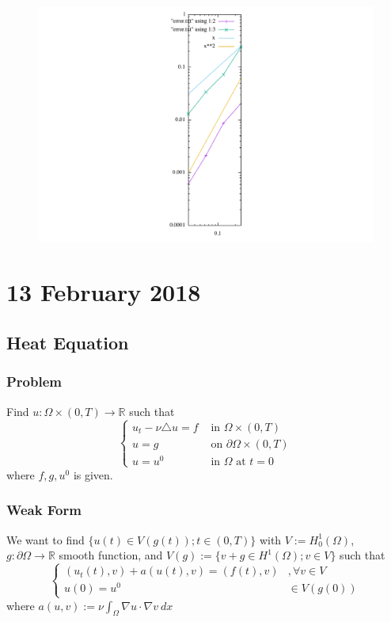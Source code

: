 \documentclass[a4paper,10pt]{article}
\begin{document}
\begin{figure}[h!]
	\centering
	\includegraphics[width=0.7\linewidth]{picture/Figure}
	\caption{}
	\label{fig:figure}
\end{figure}

\section{13 February 2018}
\subsection{Heat Equation}
\subsubsection{Problem}
Find $ u : \Omega \times (0,T) \rightarrow \mathbb{R} $ such that
\[ \begin{cases}
u_{t} - \nu \triangle u = f &\text{ in } \Omega \times (0,T) \\
u = g &\text{ on } \partial\Omega \times (0,T) \\
u = u^{0} &\text{ in } \Omega \text{ at } t=0
\end{cases} \]
where $ f,g,u^{0} $ is given.

\subsubsection{Weak Form}
We want to find $ \{ u(t) \in V(g(t)) ; t \in (0,T)\} $ with $ V := H_{0}^{1}(\Omega) $, $ g : \partial\Omega \rightarrow \mathbb{R} $ smooth function, and $ V(g) := \{ v+g \in H^{1}(\Omega) ; v \in V \} $ such that
\[ \begin{cases}
(u_{t}(t),v) + a(u(t),v) = (f(t),v) &, \forall v \in V \\
u(0) = u^{0} & \in V(g(0))
\end{cases} \]
where $ a(u,v) := \nu \int_{\Omega} \nabla u \cdot \nabla v \ dx $
\end{document}
